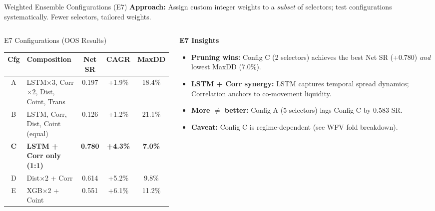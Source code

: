 \documentclass[aspectratio=169,10pt]{beamer}
\begin{document}
\begin{frame}{Weighted Ensemble Configurations (E7)}
  \small\textbf{Approach:} Assign custom integer weights to a \emph{subset} of selectors; test configurations systematically. Fewer selectors, tailored weights.
  \vspace{4pt}
  \begin{columns}[T]
    \begin{column}{0.55\textwidth}
      \begin{block}{E7 Configurations (OOS Results)}
        \centering\scriptsize\renewcommand{\arraystretch}{1.3}
        \begin{tabular}{c>{\raggedright}p{3.8cm}ccc}
          \toprule
          \textbf{Cfg} & \textbf{Composition} & \textbf{Net SR} & \textbf{CAGR} & \textbf{MaxDD} \\
          \midrule
          A & LSTM$\times$3, Corr$\times$2, Dist, Coint, Trans
                    & 0.197 & +1.9\% & 18.4\% \\
          B & LSTM, Corr, Dist, Coint (equal)
                    & 0.126 & +1.2\% & 21.1\% \\
          \rowcolor{hlrow}\textbf{C} & \textbf{LSTM + Corr only (1:1)}
                    & \textbf{\color{goodgreen}0.780} & \textbf{+4.3\%} & \textbf{7.0\%} \\
          D & Dist$\times$2 + Corr
                    & 0.614 & +5.2\% & 9.8\% \\
          E & XGB$\times$2 + Coint
                    & 0.551 & +6.1\% & 11.2\% \\
          \bottomrule
        \end{tabular}
      \end{block}
    \end{column}
    \begin{column}{0.42\textwidth}
      \textbf{E7 Insights}
      \begin{itemize}\itemsep4pt
        \item \textbf{Pruning wins:} Config C (2 selectors) achieves the best Net SR (+0.780) \emph{and} lowest MaxDD (7.0\%).
        \item \textbf{LSTM + Corr synergy:} LSTM captures temporal spread dynamics; Correlation anchors to co-movement liquidity.
        \item \textbf{More $\neq$ better:} Config A (5 selectors) lags Config C by 0.583 SR.
        \item \textbf{Caveat:} Config C is regime-dependent (see WFV fold breakdown).
      \end{itemize}
    \end{column}
  \end{columns}
\end{frame}
\end{document}
